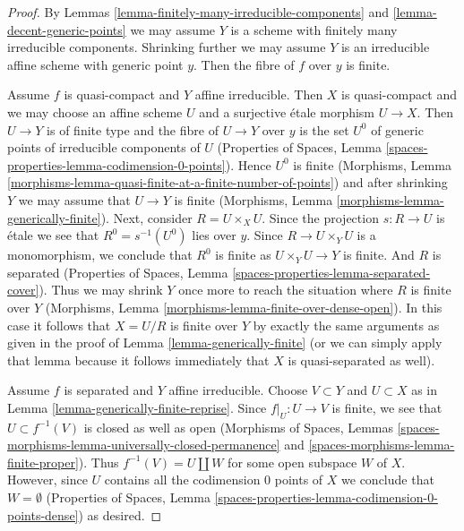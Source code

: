 \documentclass{stacks-project}
\theoremstyle{plain}
\theoremstyle{definition}
\theoremstyle{remark}
\numberwithin{equation}{subsection}
\begin{document}
\begin{proof}
By Lemmas \ref{lemma-finitely-many-irreducible-components} and
\ref{lemma-decent-generic-points} we may assume $Y$ is a scheme
with finitely many irreducible components. Shrinking further we
may assume $Y$ is an irreducible affine scheme with generic point $y$.
Then the fibre of $f$ over $y$ is finite.

\medskip\noindent
Assume $f$ is quasi-compact and $Y$ affine irreducible. Then $X$ is
quasi-compact and we may choose an affine scheme $U$ and a
surjective \'etale morphism $U \to X$. Then $U \to Y$ is of finite type
and the fibre of $U \to Y$ over $y$ is the set $U^0$ of generic points of
irreducible components of $U$ (Properties of Spaces, Lemma
\ref{spaces-properties-lemma-codimension-0-points}).
Hence $U^0$ is finite
(Morphisms, Lemma
\ref{morphisms-lemma-quasi-finite-at-a-finite-number-of-points})
and after shrinking $Y$ we may assume that $U \to Y$ is finite
(Morphisms, Lemma \ref{morphisms-lemma-generically-finite}).
Next, consider $R = U \times_X U$. Since the projection
$s : R \to U$ is \'etale we see that $R^0 = s^{-1}(U^0)$
lies over $y$. Since $R \to U \times_Y U$ is a monomorphism,
we conclude that $R^0$ is finite as $U \times_Y U \to Y$ is finite.
And $R$ is separated
(Properties of Spaces, Lemma \ref{spaces-properties-lemma-separated-cover}).
Thus we may shrink $Y$ once more to reach the situation
where $R$ is finite over $Y$
(Morphisms, Lemma \ref{morphisms-lemma-finite-over-dense-open}).
In this case it follows that $X = U/R$ is finite over $Y$
by exactly the same arguments as given in the proof of
Lemma \ref{lemma-generically-finite}
(or we can simply apply that lemma because
it follows immediately that $X$ is quasi-separated as well).

\medskip\noindent
Assume $f$ is separated and $Y$ affine irreducible. Choose $V \subset Y$
and $U \subset X$ as in Lemma \ref{lemma-generically-finite-reprise}.
Since $f|_U : U \to V$ is finite, we see that $U \subset f^{-1}(V)$
is closed as well as open
(Morphisms of Spaces, Lemmas
\ref{spaces-morphisms-lemma-universally-closed-permanence} and
\ref{spaces-morphisms-lemma-finite-proper}).
Thus $f^{-1}(V) = U \amalg W$ for some
open subspace $W$ of $X$. However, since $U$ contains all the codimension
$0$ points of $X$ we conclude that $W = \emptyset$
(Properties of Spaces, Lemma
\ref{spaces-properties-lemma-codimension-0-points-dense})
as desired.
\end{proof}
\end{document}
